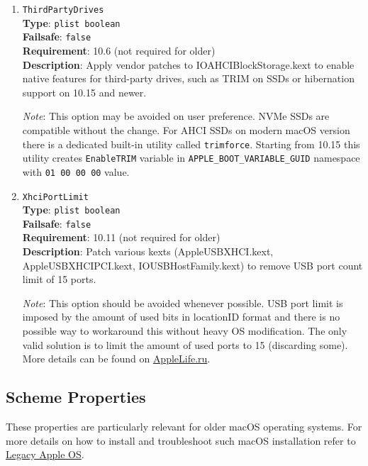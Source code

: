 \documentclass[]{article}
\begin{document}
\begin{enumerate}
\item
  \texttt{ThirdPartyDrives}\\
  \textbf{Type}: \texttt{plist\ boolean}\\
  \textbf{Failsafe}: \texttt{false}\\
  \textbf{Requirement}: 10.6 (not required for older)\\
  \textbf{Description}: Apply vendor patches to IOAHCIBlockStorage.kext to enable
  native features for third-party drives, such as TRIM on SSDs or hibernation
  support on 10.15 and newer.

  \emph{Note}: This option may be avoided on user preference. NVMe SSDs are
  compatible without the change. For AHCI SSDs on modern macOS version there
  is a dedicated built-in utility called \texttt{trimforce}. Starting from 10.15
  this utility creates \texttt{EnableTRIM} variable in \texttt{APPLE\_BOOT\_VARIABLE\_GUID}
  namespace with \texttt{01 00 00 00} value.

\item
  \texttt{XhciPortLimit}\\
  \textbf{Type}: \texttt{plist\ boolean}\\
  \textbf{Failsafe}: \texttt{false}\\
  \textbf{Requirement}: 10.11 (not required for older)\\
  \textbf{Description}: Patch various kexts (AppleUSBXHCI.kext, AppleUSBXHCIPCI.kext,
  IOUSBHostFamily.kext) to remove USB port count limit of 15 ports.

  \emph{Note}: This option should be avoided whenever possible. USB port limit
  is imposed by the amount of used bits in locationID format and there is no
  possible way to workaround this without heavy OS modification. The only
  valid solution is to limit the amount of used ports to 15 (discarding some).
  More details can be found on \href{https://applelife.ru/posts/550233}{AppleLife.ru}.

\end{enumerate}

\subsection{Scheme Properties}\label{kernelpropsscheme}

These properties are particularly relevant for older macOS operating systems.
For more details on how to install and troubleshoot such macOS installation
refer to \hyperref[legacyapple]{Legacy Apple OS}.
\end{document}
